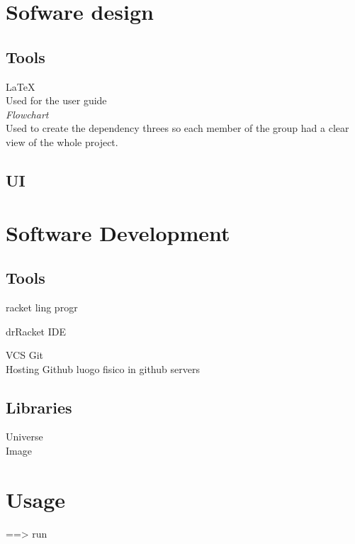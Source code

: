 \documentclass{article}
\begin{document}
 \section{Sofware design}
 \subsection{Tools}
 \hspace{0.5cm}\LaTeX \\
 Used for the user guide\\
 
 \textit{Flowchart}\\
 Used to create the dependency threes so each member of the group had a clear view of the whole project.
 

 \subsection{UI}

 \section{Software Development}
 \subsection{Tools}
 
 racket ling progr
 
 drRacket IDE
 
 
 VCS Git \\
 
 
Hosting Github
luogo fisico in github servers

\subsection{Libraries}
Universe \\
Image

 \section{Usage}
 
 ==> run

\end{document}

